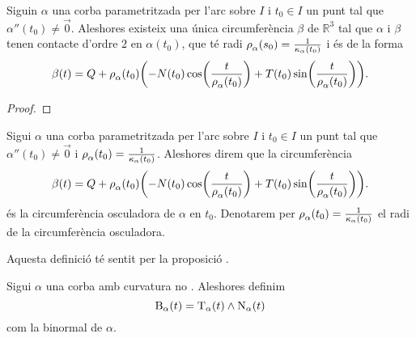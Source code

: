 \documentclass[../Apunts.tex]{subfiles}
\begin{document}
	\begin{proposition}
		\label{prop:circumferència osculadora}
		Siguin \(\alpha\) una corba parametritzada per l'arc sobre \(I\) i \(t_{0}\in I\) un punt tal que \(\alpha''(t_{0})\neq\vec{0}\). Aleshores existeix una única circumferència \(\beta\) de \(\mathbb{R}^{3}\) tal que \(\alpha\) i \(\beta\) tenen contacte d'ordre \(2\) en \(\alpha(t_{0})\), que té radi \(\operatorname{\rho}_{\alpha}(s_{0})=\frac{1}{\operatorname{\kappa}_{\alpha}(t_{0})}\) i és de la forma
		\[\beta(t)=Q+\radicircosculadora_{\alpha}(t_{0})\left(-N(t_{0})\cos\left(\frac{t}{\radicircosculadora_{\alpha}(t_{0})}\right)+T(t_{0})\sin\left(\frac{t}{\radicircosculadora_{\alpha}(t_{0})}\right)\right).\]
		\begin{proof}
%			
		\end{proof}
	\end{proposition}
	\begin{definition}
		\label{def:circumferència osculadora}
		Sigui \(\alpha\) una corba parametritzada per l'arc sobre \(I\) i \(t_{0}\in I\) un punt tal que \(\alpha''(t_{0})\neq\vec{0}\) i \(\operatorname{\rho}_{\alpha}(t_{0})=\frac{1}{\operatorname{\kappa}_{\alpha}(t_{0})}\). Aleshores direm que la circumferència
		\[\beta(t)=Q+\radicircosculadora_{\alpha}(t_{0})\left(-N(t_{0})\cos\left(\frac{t}{\radicircosculadora_{\alpha}(t_{0})}\right)+T(t_{0})\sin\left(\frac{t}{\radicircosculadora_{\alpha}(t_{0})}\right)\right).\]
		és la circumferència osculadora de \(\alpha\) en \(t_{0}\). Denotarem per \(\operatorname{\rho}_{\alpha}(t_{0})=\frac{1}{\operatorname{\kappa}_{\alpha}(t_{0})}\) el radi de la circumferència osculadora.
		
		Aquesta definició té sentit per la proposició .
	\end{definition}
	\begin{definition}[Binormal]
		\label{def:binormal}
		Sigui \(\alpha\) una corba amb curvatura no \nulla{}. Aleshores definim
		\[\operatorname{B}_{\alpha}(t)=\operatorname{T}_{\alpha}(t)\mathbin{\wedge}\operatorname{N}_{\alpha}(t)\]
		com la binormal de \(\alpha\).
	\end{definition}
\end{document}
